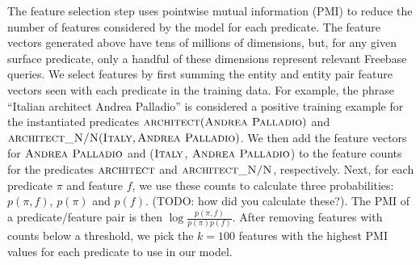 \documentclass[11pt]{article}
\newcommand{\formalpredicate}[1]{\ensuremath{\textsc{#1}}}
\newcommand{\entity}[1]{\ensuremath{\textsc{#1}}}
\begin{document}
% 


The feature selection step uses pointwise mutual information (PMI) to
reduce the number of features considered by the model for each
predicate. The feature vectors generated above have tens of millions
of dimensions, but, for any given surface predicate, only a handful of
these dimensions represent relevant Freebase queries. We select
features by first summing the entity and entity pair feature vectors
seen with each predicate in the training data. For example, the phrase
``Italian architect Andrea Palladio'' is considered a positive
training example for the instantiated predicates
$\formalpredicate{architect}(\entity{Andrea Palladio})$ and
$\formalpredicate{architect\_N/N}(\entity{Italy}, \entity{Andrea
  Palladio})$. We then add the feature vectors for \entity{Andrea
  Palladio} and (\entity{Italy}, \entity{Andrea Palladio}) to the
feature counts for the predicates \formalpredicate{architect} and
\formalpredicate{architect\_N/N}, respectively. Next, for each predicate
$\pi$ and feature $f$, we use these counts to calculate three
probabilities: $p(\pi, f)$, $p(\pi)$ and $p(f)$. (TODO: how did you
calculate these?). The PMI of a predicate/feature pair is then $\log
\frac{p(\pi, f)}{p(\pi)p(f)}$. After removing features with counts
below a threshold, we pick the $k=100$ features with the highest PMI
values for each predicate to use in our model.
\end{document}
